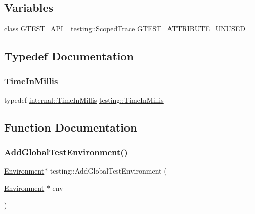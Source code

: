 \subsection*{Variables}
\begin{DoxyCompactItemize}
\item 
class \hyperlink{gtest-port_8h_aa73be6f0ba4a7456180a94904ce17790}{G\+T\+E\+S\+T\+\_\+\+A\+P\+I\+\_\+} \hyperlink{classtesting_1_1ScopedTrace}{testing\+::\+Scoped\+Trace} \hyperlink{namespacetesting_aa09221196f0a830d5bf1c63ffce69dc3}{G\+T\+E\+S\+T\+\_\+\+A\+T\+T\+R\+I\+B\+U\+T\+E\+\_\+\+U\+N\+U\+S\+E\+D\+\_\+}
\end{DoxyCompactItemize}


\subsection{Typedef Documentation}
\mbox{\label{namespacetesting_a992de1d091ce660f451d1e8b3ce30fd6}} 
\subsubsection{\texorpdfstring{Time\+In\+Millis}{TimeInMillis}}
{\footnotesize\ttfamily typedef \hyperlink{namespacetesting_1_1internal_a66a845df404b38fe85c5e14a069f255a}{internal\+::\+Time\+In\+Millis} \hyperlink{namespacetesting_a992de1d091ce660f451d1e8b3ce30fd6}{testing\+::\+Time\+In\+Millis}}



\subsection{Function Documentation}
\mbox{\label{namespacetesting_a460d7b998622e332392c1e00be3a60d5}} 
\subsubsection{\texorpdfstring{Add\+Global\+Test\+Environment()}{AddGlobalTestEnvironment()}}
{\footnotesize\ttfamily \hyperlink{classtesting_1_1Environment}{Environment}$\ast$ testing\+::\+Add\+Global\+Test\+Environment (\begin{DoxyParamCaption}\item[{\hyperlink{classtesting_1_1Environment}{Environment} $\ast$}]{env }\end{DoxyParamCaption})\hspace{0.3cm}{\ttfamily [inline]}}


